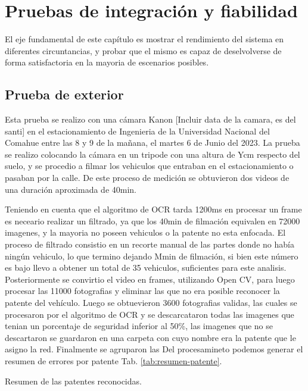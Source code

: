\chapter{Pruebas de integración y fiabilidad}

El eje fundamental de este capítulo es mostrar el rendimiento del sistema en diferentes circuntancias, y probar que el mismo es capaz de deselvolverse de forma satisfactoria en la mayoria de escenarios posibles.

\section{Prueba de exterior}

Esta prueba se realizo con una cámara Kanon [Incluir data de la camara, es del santi] en el estacionamiento de Ingenieria de la Universidad Nacional del Comahue entre las 8 y 9 de la mañana, el martes 6 de Junio del 2023. La prueba se realizo colocando la cámara en un tripode con una altura de Ycm respecto del suelo, y se procedio a filmar los vehiculos que entraban en el estacionamiento o pasaban por la calle. De este proceso de medición se obtuvieron dos videos de una duración aproximada de 40min.

Teniendo en cuenta que el algoritmo de OCR tarda 1200ms en procesar un frame es neceario realizar un filtrado, ya que los 40min de filmación equivalen en 72000 imagenes, y la mayoria no poseen vehiculos o la patente no esta enfocada. El proceso de filtrado consistio en un recorte manual de las partes donde no había ningún vehiculo, lo que termino dejando Mmin de filmación, si bien este número es bajo llevo a obtener un total de 35 vehiculos, suficientes para este analisis. Posteriormente se convirtio el video en frames, utilizando Open CV, para luego procesar las 11000 fotografias y eliminar las que no era posible reconocer la patente del vehículo. Luego se obtuevieron 3600 fotografias validas, las cuales se procesaron por el algoritmo de OCR y se descarcataron todas las imagenes que tenian un porcentaje de seguridad inferior al 50\%, las imagenes que no se descartaron se guardaron en una carpeta con cuyo nombre era la patente que le asigno la red. Finalmente se agruparon las
Del procesamineto podemos generar el resumen de errores por patente Tab. \ref{tab:resumen-patente}.

\begin{table}
    \centering
    
    \caption{Resumen de las patentes reconocidas.}
    \label{tab:resumen-patente}
\end{table}

